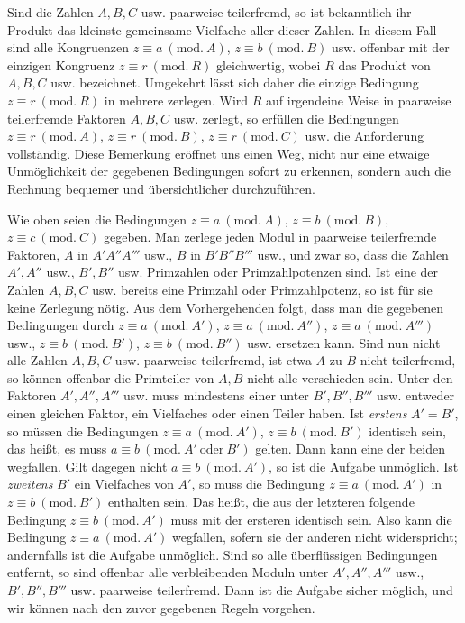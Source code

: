Sind die Zahlen $A,B,C$ usw. paarweise teilerfremd, so ist bekanntlich ihr Produkt das kleinste gemeinsame Vielfache aller dieser Zahlen. In diesem Fall sind alle Kongruenzen $z\equiv a\ (\mathrm{mod.}\ A)$, $z\equiv b\ (\mathrm{mod.}\ B)$ usw. offenbar mit der einzigen Kongruenz $z\equiv r\ (\mathrm{mod.}\ R)$ gleichwertig, wobei $R$ das Produkt von $A,B,C$ usw. bezeichnet. Umgekehrt lässt sich daher die einzige Bedingung $z\equiv r\ (\mathrm{mod.}\ R)$ in mehrere zerlegen. Wird $R$ auf irgendeine Weise in paarweise teilerfremde Faktoren $A,B,C$ usw. zerlegt, so erfüllen die Bedingungen $z\equiv r\ (\mathrm{mod.}\ A)$, $z\equiv r\ (\mathrm{mod.}\ B)$, $z\equiv r\ (\mathrm{mod.}\ C)$ usw. die Anforderung vollständig. Diese Bemerkung eröffnet uns einen Weg,
nicht nur eine etwaige Unmöglichkeit der gegebenen Bedingungen sofort zu erkennen, sondern auch die Rechnung bequemer und übersichtlicher durchzuführen.


Wie oben seien die Bedingungen $z\equiv a\ (\mathrm{mod.}\ A)$, $z\equiv b\ (\mathrm{mod.}\ B)$, $z\equiv c\ (\mathrm{mod.}\ C)$ gegeben. Man zerlege jeden Modul in paarweise teilerfremde Faktoren, $A$ in $A'A''A'''$ usw., $B$ in $B'B''B'''$ usw., und zwar so, dass die Zahlen $A',A''$ usw., $B',B''$ usw. Primzahlen oder Primzahlpotenzen sind. Ist eine der Zahlen $A,B,C$ usw. bereits eine Primzahl oder Primzahlpotenz, so ist für sie keine Zerlegung nötig. Aus dem Vorhergehenden folgt, dass man die gegebenen Bedingungen durch $z\equiv a\ (\mathrm{mod.}\ A')$, $z\equiv a\ (\mathrm{mod.}\ A'')$, $z\equiv a\ (\mathrm{mod.}\ A''')$ usw., $z\equiv b\ (\mathrm{mod.}\ B')$, $z\equiv b\ (\mathrm{mod.}\ B'')$ usw. ersetzen kann. Sind nun nicht alle Zahlen $A,B,C$ usw. paarweise teilerfremd, ist etwa $A$ zu $B$ nicht teilerfremd, so können offenbar die Primteiler von $A,B$ nicht alle verschieden sein. Unter den Faktoren $A',A'',A'''$ usw. muss mindestens einer unter $B',B'',B'''$ usw. entweder einen gleichen Faktor, ein Vielfaches oder einen Teiler haben. Ist \emph{erstens} $A'=B'$, so müssen die Bedingungen $z\equiv a\ (\mathrm{mod.}\ A')$, $z\equiv b\ (\mathrm{mod.}\ B')$ identisch sein, das heißt, es muss $a\equiv b\ (\mathrm{mod.}\ A'\ \text{oder}\ B')$ gelten. Dann kann eine der beiden wegfallen. Gilt dagegen nicht $a\equiv b\ (\mathrm{mod.}\ A')$, so ist die Aufgabe unmöglich. Ist \emph{zweitens} $B'$ ein Vielfaches von $A'$, so muss die Bedingung $z\equiv a\ (\mathrm{mod.}\ A')$ in $z\equiv b\ (\mathrm{mod.}\ B')$ enthalten sein. Das heißt, die aus der letzteren folgende Bedingung $z\equiv b\ (\mathrm{mod.}\ A')$ muss mit der ersteren identisch sein. Also kann die Bedingung $z\equiv a\ (\mathrm{mod.}\ A')$ wegfallen, sofern sie der anderen nicht widerspricht; andernfalls ist die Aufgabe unmöglich. Sind so alle überflüssigen Bedingungen entfernt, so sind offenbar alle verbleibenden Moduln unter $A',A'',A'''$ usw., $B',B'',B'''$ usw. paarweise teilerfremd. Dann ist die Aufgabe sicher möglich, und wir können nach den zuvor gegebenen Regeln vorgehen.

